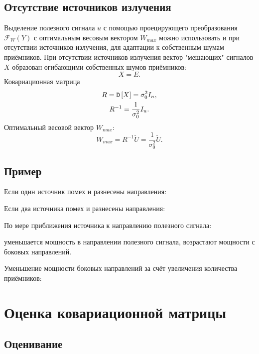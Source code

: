 \subsection{Отсутствие источников излучения}

Выделение полезного сигнала $u$ с помощью проецирующего преобразования $\mathcal{F}_W(Y)$ с оптимальным весовым вектором $W_{max}$ можно использовать и при отсутствии источников
излучения, для адаптации к собственным шумам приёмников. При отсутствии источников излучения вектор "мешающих"{} сигналов $X$ образован огибающими собственных шумов приёмников:
\[
    X = E .
\]
Ковариационная матрица
\begin{gather*}
    R = \mathtt{D} \left [ X \right ] = \sigma_0^2 I_n , \\
    R^{-1} = \frac{1}{\sigma_0^2} I_n .
\end{gather*}
Оптимальный весовой вектор $W_{max}$:
\[
    W_{max}
    = R^{-1} \breve{U}
    = \frac{1}{\sigma_0^2} \breve{U} .
\]

\subsection{Пример}

Если один источник помех и разнесены направления:

Если два источника помех и разнесены направления:

По мере приближения источника к направлению полезного сигнала:
\begin{Matlab}
\end{Matlab}
\noindent уменьшается мощность в направлении полезного сигнала, возрастают мощности с боковых направлений.

Уменьшение мощности боковых направлений за счёт увеличения количества приёмников:
\begin{Matlab}
\end{Matlab}


\section{Оценка ковариационной матрицы}

\subsection{Оценивание}

